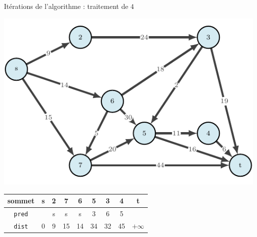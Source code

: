 \begin{frame}{Itérations de l'algorithme : traitement de $4$}
    \begin{center}
        \includegraphics[height=.6\textheight]{fig/ordinal-0.pdf}      
    \begin{tabular}{c|cccccccc}
        
        sommet & s       &2      &7      &6      &5      &3      &4      &t      \\
        \hline
        \texttt{pred} & &s      &s      &s      &3      &6      &5      &       \\
        \texttt{dist} & 0       &9      &15     &14     &34     &32     &45     &$+\infty$    \\
    \end{tabular}
\end{center}
\end{frame}

